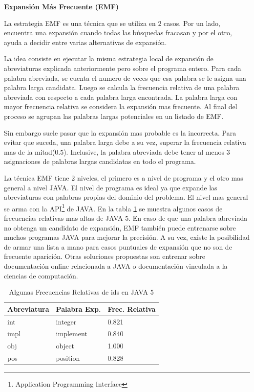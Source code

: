 \documentclass[a4paper,12pt]{report}
\begin{document}
\pagebreak
\noindent \textbf{Expansión Más Frecuente (EMF)\\}


La estrategia EMF\cite{EZH08} es una técnica que se utiliza en 2 casos. Por un lado, 
encuentra una expansión cuando todas las búsquedas fracasan y por el otro, ayuda a decidir entre varias alternativas de expansión. 

La idea consiste en ejecutar la misma estrategia local de expansión de abreviaturas explicada anteriormente pero sobre el programa entero. Para cada palabra abreviada, se cuenta el numero de veces que esa palabra se le asigna una palabra larga candidata. Luego se calcula la frecuencia relativa de una palabra abreviada con respecto a cada palabra larga encontrada. La palabra larga con mayor frecuencia relativa se considera la expansión mas frecuente. Al final del proceso se agrupan las palabras largas potenciales en un listado de EMF.

Sin embargo suele pasar que la expansión mas probable es la incorrecta. Para evitar que suceda, una palabra larga debe a su vez, superar la frecuencia relativa mas de la mitad(0.5). Inclusive, la palabra abreviada debe tener al menos 3 asignaciones de palabras largas candidatas en todo el programa.

La técnica EMF tiene 2 niveles, el primero es a nivel de programa y el otro mas general a nivel JAVA. El nivel de programa es ideal ya que expande las abreviaturas con palabras propias del dominio del problema. El nivel mas general se arma con la API\footnote[1]{Application Programming Interface} de JAVA. En la tabla \ref{tab_emf} se muestra algunos casos de frecuencias relativas mas altas de JAVA 5. En caso de que una palabra abreviada no obtenga un candidato de expansión, EMF también puede entrenarse sobre muchos programas JAVA para mejorar la precisión. A su vez, existe la posibilidad de armar una lista a mano para casos puntuales de expansión que no son de frecuente aparición. Otras soluciones propuestas son entrenar sobre documentación online relacionada a JAVA o documentación vinculada a la ciencias de computación.

\begin{table}
\begin{center}
   \begin{tabular}{| l |l | l |}
     \hline \textsf{Abreviatura} & \textsf{Palabra Exp.} & \textsf{Frec. Relativa} \\
     \hline \textsf{int} & \textsf{integer} & 0.821 \\
     \hline \textsf{impl} & \textsf{implement} & 0.840 \\
     \hline \textsf{obj} & \textsf{object} & 1.000 \\
     \hline \textsf{pos} & \textsf{position} & 0.828 \\
     \hline	   
   \end{tabular}
   \label{tab_emf}
\caption{Algunas Frecuencias Relativas de ids en JAVA 5}
\end{center}   
\end {table}
\end{document}
